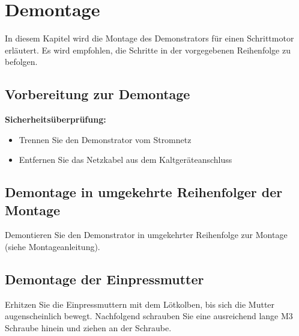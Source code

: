 %

\chapter{Demontage}
In diesem Kapitel wird die Montage des Demonstrators für einen Schrittmotor erläutert. Es wird empfohlen, die Schritte in der vorgegebenen Reihenfolge zu befolgen.


\section{ Vorbereitung zur Demontage}

\textbf{Sicherheitsüberprüfung:}\begin{itemize}
		\item Trennen Sie den Demonstrator vom Stromnetz 
		\item Entfernen Sie das Netzkabel aus dem Kaltgeräteanschluss
	\end{itemize}

\section{ Demontage in umgekehrte Reihenfolger der Montage}

Demontieren Sie den Demonstrator in umgekehrter Reihenfolge zur Montage (siehe Montageanleitung).

\section{ Demontage der Einpressmutter}
Erhitzen Sie die Einpressmuttern mit dem Lötkolben, bis sich die Mutter augenscheinlich bewegt. Nachfolgend schrauben Sie eine ausreichend lange M3 Schraube hinein und ziehen an der Schraube.

